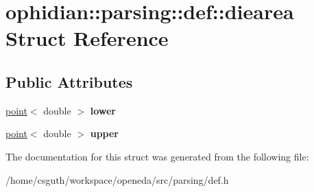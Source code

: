 \hypertarget{structophidian_1_1parsing_1_1def_1_1diearea}{\section{ophidian\-:\-:parsing\-:\-:def\-:\-:diearea Struct Reference}
\label{structophidian_1_1parsing_1_1def_1_1diearea}
}
\subsection*{Public Attributes}
\begin{DoxyCompactItemize}
\item 
\hypertarget{structophidian_1_1parsing_1_1def_1_1diearea_a48fc77022ef987220ee741d86f26cefd}{\hyperlink{structophidian_1_1parsing_1_1def_1_1point}{point}$<$ double $>$ {\bfseries lower}}\label{structophidian_1_1parsing_1_1def_1_1diearea_a48fc77022ef987220ee741d86f26cefd}

\item 
\hypertarget{structophidian_1_1parsing_1_1def_1_1diearea_af8c538ef1388df6297640d95d9b8524a}{\hyperlink{structophidian_1_1parsing_1_1def_1_1point}{point}$<$ double $>$ {\bfseries upper}}\label{structophidian_1_1parsing_1_1def_1_1diearea_af8c538ef1388df6297640d95d9b8524a}

\end{DoxyCompactItemize}


The documentation for this struct was generated from the following file\-:\begin{DoxyCompactItemize}
\item 
/home/csguth/workspace/openeda/src/parsing/def.\-h\end{DoxyCompactItemize}
